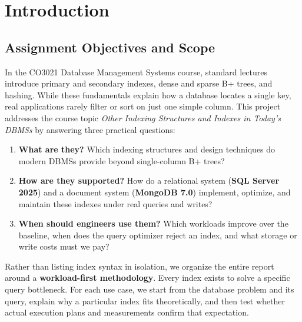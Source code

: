 \chapter{Introduction}
\label{ch:intro}

\section{Assignment Objectives and Scope}
In the CO3021 Database Management Systems course, standard lectures introduce primary and secondary indexes, dense and sparse B+ trees, and hashing. While these fundamentals explain how a database locates a single key, real applications rarely filter or sort on just one simple column. This project addresses the course topic \emph{Other Indexing Structures and Indexes in Today's DBMSs} by answering three practical questions:
\begin{enumerate}
\item \textbf{What are they?} Which indexing structures and design techniques do modern DBMSs provide beyond single-column B+ trees?
\item \textbf{How are they supported?} How do a relational system (\textbf{SQL Server 2025}) and a document system (\textbf{MongoDB 7.0}) implement, optimize, and maintain these indexes under real queries and writes?
\item \textbf{When should engineers use them?} Which workloads improve over the baseline, when does the query optimizer reject an index, and what storage or write costs must we pay?
\end{enumerate}

Rather than listing index syntax in isolation, we organize the entire report around a \textbf{workload-first methodology}. Every index exists to solve a specific query bottleneck. For each use case, we start from the database problem and its query, explain why a particular index fits theoretically, and then test whether actual execution plans and measurements confirm that expectation.

